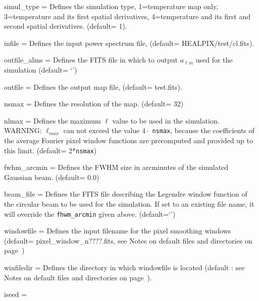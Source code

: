 \begin{qualifiers}
  \begin{qulistwide}{} %
     \item[{simul\_type = }]%
 Defines the simulation type, 1=temperature map only,
       3=temperature and its first spatial derivatives,
       4=temperature and its first and second spatial derivatives.
(default= 1).
    \item[{infile = }]%
 Defines the input power spectrum file,
	(default= HEALPIX/test/cl.fits).
%
    \item[{outfile\_alms = }]%
 Defines the FITS file in which to output $a_{\ell m}$ used
      for the simulation (default= `')
%
    \item[{outfile = }]%
 Defines the output map file, (default= test.fits).
%
    \item[{nsmax = }]%
 Defines the resolution of the map.
(default= 32)
%
     \item[{nlmax = }]%
 Defines the maximum $\ell$ value 
to be used in the simulation. WARNING: $\ell_{max}$ can not exceed
the value $4\cdot$ {\tt nsmax}, because the coefficients of the  average Fourier 
pixel window functions
are precomputed and provided up to this limit.
(default= 2*{\tt nsmax})
%
    \item[{fwhm\_arcmin = }]%
 Defines the FWHM size in arcminutes 
of the simulated Gaussian beam.
(default= 0.0)
%
    \item[{beam\_file = }]%
 Defines the FITS file describing the
    Legendre window
    function of the circular beam to be used for the
    simulation. If set to an existing file name, it will override the
    {\tt fhwm\_arcmin} given above. (default=`')
%
     \item[{windowfile = }]%
 Defines the input filename  for the pixel
    smoothing windows 
(default= pixel\_window\_n????.fits, see Notes on default files and directories
on page~\pageref{page:defdir})
%
     \item[{winfiledir = }] Defines the directory in which windowfile
    is located (default : see Notes on default files and directories on
page~\pageref{page:defdir}).
%
      \item[{iseed = }]%

\end{qulistwide}
\end{qualifiers}
